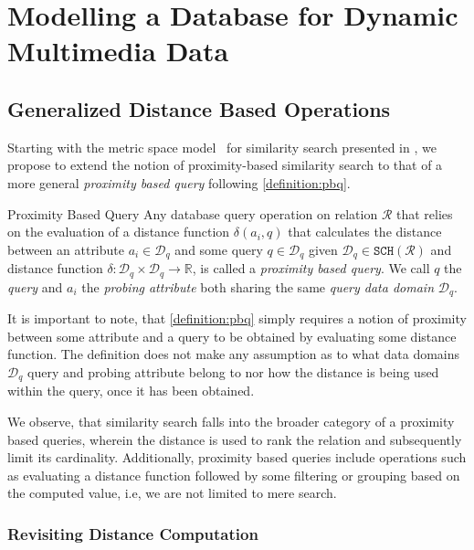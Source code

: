 \chapter{Modelling a Database for Dynamic Multimedia Data}
\label{chapter:system_model}

\section{Generalized Distance Based Operations}

Starting with the metric space model~\cite{Zezula:2006similarity} for similarity search presented in , we propose to extend the notion of proximity-based similarity search to that of a more general \emph{proximity based query} following \cref{definition:pbq}.

\begin{definition}[label=definition:pbq]{Proximity Based Query}{}
    Any database query operation on relation $\mathcal{R}$ that relies on the evaluation of a distance function $\delta(a_{i}, q)$ that calculates the distance between an attribute $a_{i} \in \mathcal{D}_q$ and some query $q \in \mathcal{D}_q$ given $\mathcal{D}_q \in \mathtt{SCH}(\mathcal{R})$ and distance function $\delta: \mathcal{D}_q \times \mathcal{D}_q \rightarrow \mathbb{R}$, is called a \emph{proximity based query}. We call $q$ the \emph{query} and $a_i$ the \emph{probing attribute} both sharing the same \emph{query data domain} $\mathcal{D}_q$.
\end{definition}

It is important to note, that \cref{definition:pbq} simply requires a notion of proximity between some attribute and a query to be obtained by evaluating some distance function. The definition does not make any assumption as to what data domains $\mathcal{D}_q$ query and probing attribute belong to nor how the distance is being used within the query, once it has been obtained. 

We observe, that similarity search falls into the broader category of a proximity based queries, wherein the distance is used to rank the relation and subsequently limit its cardinality. Additionally, proximity based queries include operations such as evaluating a distance function followed by some filtering or grouping based on the computed value, i.e, we are not limited to mere search.

\subsection{Revisiting Distance Computation}

